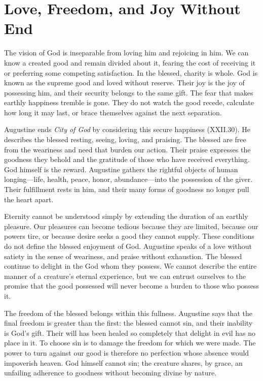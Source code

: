 \section{Love, Freedom, and Joy Without End}

The vision of God is inseparable from loving him and rejoicing in him. We can know a created good and remain divided about it, fearing the cost of receiving it or preferring some competing satisfaction. In the blessed, charity is whole. God is known as the supreme good and loved without reserve. Their joy is the joy of possessing him, and their security belongs to the same gift. The fear that makes earthly happiness tremble is gone. They do not watch the good recede, calculate how long it may last, or brace themselves against the next separation.

Augustine ends \emph{City of God} by considering this secure happiness (XXII.30). He describes the blessed resting, seeing, loving, and praising. The blessed are free from the weariness and need that burden our action. Their praise expresses the goodness they behold and the gratitude of those who have received everything. God himself is the reward. Augustine gathers the rightful objects of human longing---life, health, peace, honor, abundance---into the possession of the giver. Their fulfillment rests in him, and their many forms of goodness no longer pull the heart apart.

Eternity cannot be understood simply by extending the duration of an earthly pleasure. Our pleasures can become tedious because they are limited, because our powers tire, or because desire seeks a good they cannot supply. These conditions do not define the blessed enjoyment of God. Augustine speaks of a love without satiety in the sense of weariness, and praise without exhaustion. The blessed continue to delight in the God whom they possess. We cannot describe the entire manner of a creature's eternal experience, but we can entrust ourselves to the promise that the good possessed will never become a burden to those who possess it.

The freedom of the blessed belongs within this fullness. Augustine says that the final freedom is greater than the first: the blessed cannot sin, and their inability is God's gift. Their will has been healed so completely that delight in evil has no place in it. To choose sin is to damage the freedom for which we were made. The power to turn against our good is therefore no perfection whose absence would impoverish heaven. God himself cannot sin; the creature shares, by grace, an unfailing adherence to goodness without becoming divine by nature.

